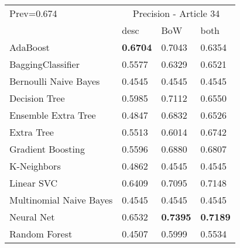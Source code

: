\begin{tabular}{|l|l|l|l| }
\hline
Prev=0.674 &  \multicolumn{3}{c|}{Precision - Article 34} \\
\cline{2-4} & desc & BoW & both \\ \hline
AdaBoost                & {\bf 0.6704} & 0.7043 & 0.6354\\
BaggingClassifier       & 0.5577 & 0.6329 & 0.6521\\
Bernoulli Naive Bayes   & 0.4545 & 0.4545 & 0.4545\\
Decision Tree           & 0.5985 & 0.7112 & 0.6550\\
Ensemble Extra Tree     & 0.4847 & 0.6832 & 0.6526\\
Extra Tree              & 0.5513 & 0.6014 & 0.6742\\
Gradient Boosting       & 0.5596 & 0.6880 & 0.6807\\
K-Neighbors             & 0.4862 & 0.4545 & 0.4545\\
Linear SVC              & 0.6409 & 0.7095 & 0.7148\\
Multinomial Naive Bayes & 0.4545 & 0.4545 & 0.4545\\
Neural Net              & 0.6532 & {\bf 0.7395} & {\bf 0.7189}\\
Random Forest           & 0.4507 & 0.5999 & 0.5534\\
\hline
\end{tabular}